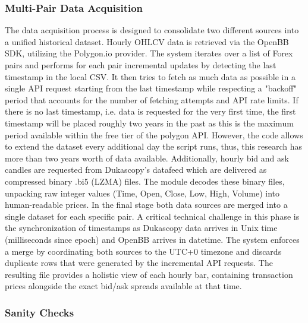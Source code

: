 \documentclass[12pt, a4paper]{article}
\begin{document}
\subsubsection{Multi-Pair Data Acquisition}\label{sec:data_acquisition}

The data acquisition process is designed to consolidate two different sources into a unified historical dataset.
Hourly OHLCV data is retrieved via the OpenBB SDK, utilizing the Polygon.io provider. 
The system iterates over a list of Forex pairs and performs for each pair incremental updates by detecting the last timestamp in the local CSV. 
It then tries to fetch as much data as possible in a single API request starting from the last timestamp while respecting a "backoff" period that accounts for the 
number of fetching attempts and API rate limits. If there is no last timestamp, i.e. data is requested for the very first time, the first timestamp will be placed roughly two years 
in the past as this is the maximum period available within the free tier of the polygon API. However, the code allows to extend the dataset every additional day the
script runs, thus, this research has more than two years worth of data available.
Additionally, hourly bid and ask candles are requested from Dukascopy's datafeed which are delivered as compressed binary .bi5 (LZMA) files. 
The module decodes these binary files, unpacking raw integer values (Time, Open, Close, Low, High, Volume) into human-readable prices.
In the final stage both data sources are merged into a single dataset for each specific pair. A critical technical challenge in this phase is the 
synchronization of timestamps as Dukascopy data arrives in Unix time (milliseconds since epoch) and OpenBB arrives in datetime. 
The system enforces a merge by coordinating both sources to the UTC+0 timezone and discards duplicate rows that were generated by the incremental API requests. 
The resulting file provides a holistic view of each hourly bar, containing transaction prices alongside the exact bid/ask spreads available at that time.


\subsubsection{Sanity Checks}\label{sec:sanity_checks}
\end{document}
